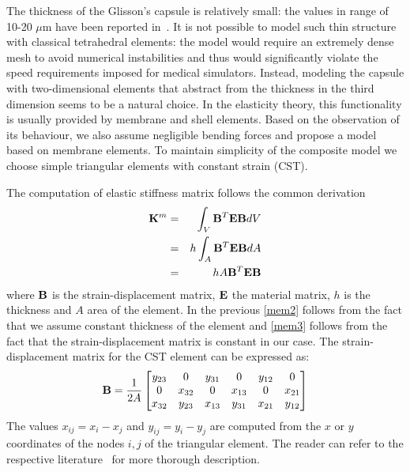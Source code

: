 The thickness of the Glisson's capsule is relatively small: the values in range of 10-20
$\mu$m have been reported in~\cite{Umale2011}.
It is not possible to model such thin structure with classical tetrahedral
elements:
the model would require an extremely 
dense mesh to avoid numerical instabilities and thus would significantly
violate the speed requirements imposed for medical simulators.
Instead, modeling the capsule with two-dimensional elements that abstract from the
thickness in the third dimension seems
to be a natural choice. In the elasticity theory, this functionality is usually provided by membrane and shell elements.
Based on the observation of its behaviour, we also
assume negligible bending forces and propose a model based on membrane
elements. 
To maintain simplicity of the composite model we choose simple triangular
elements with constant strain (CST).

The computation of elastic stiffness matrix follows the common derivation
%
\begin{eqnarray}
  \mathbf{K}^m & = & \int_V \mathbf{B}^T \mathbf{E} \mathbf{B} dV     \label{mem1} \\
            & = & h \int_A \mathbf{B}^T \mathbf{E} \mathbf{B} dA   \label{mem2} \\
            & = & h A \mathbf{B}^T \mathbf{E} \mathbf{B}           \label{mem3}
\end{eqnarray}
%
where $\mathbf{B}$ is the strain-displacement matrix, $\mathbf{E}$ the material
matrix, $h$ is the thickness and $A$ area of the element. In the previous
\eqref{mem2} follows from the fact that we assume constant thickness of the
element and \eqref{mem3} follows from the fact that the strain-displacement
matrix is constant in our case. The strain-displacement matrix for the CST
element can be expressed as:
%
\begin{equation}
  \mathbf{B} = \frac{1}{2A} \begin{bmatrix}
    y_{23} & 0      & y_{31} & 0      & y_{12} & 0 \\
         0 & x_{32} & 0      & x_{13} & 0      & x_{21} \\
    x_{32} & y_{23} & x_{13} & y_{31} & x_{21} & y_{12}
  \end{bmatrix}
\end{equation}
%
The values $x_{ij} = x_i - x_j$ and $y_{ij} = y_i - y_j$ are computed from
the $x$ or $y$ coordinates of the nodes $i,j$ of the triangular element.
The reader can refer to the respective literature~\cite{Felippa2003} for more thorough
description.

